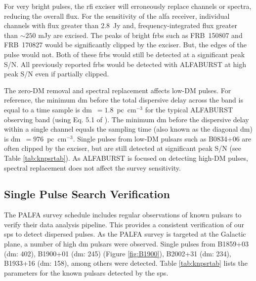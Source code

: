 \documentclass[a4paper,fleqn,usenatbib]{mnras}
\begin{document}
For very bright pulses, the \gls{rfi} exciser will erroneously replace channels
or spectra, reducing the overall flux.  For the sensitivity of the \gls{alfa}
receiver, individual channels with flux greater than 2.8~Jy and,
frequency-integrated flux greater than $\sim250$ mJy are excised. The peaks of
bright \glspl{frb} such as FRB~150807 and FRB~170827 would be significantly
clipped by the exciser. But, the edges of the pulse would not. Both of these
\glspl{frb} would still be detected at a significant peak S/N. All previously
reported \glspl{frb} would be detected with ALFABURST at high peak S/N even if
partially clipped.

The zero-DM removal and spectral replacement affects low-DM pulses. For
reference, the minimum \gls{dm} before the total dispersive delay across the
band is equal to a time sample is \gls{dm}~$=1.8$~pc~cm$^{-3}$ for the
typical ALFABURST observing band (using Eq. 5.1 of \cite{2004hpa..book.....L}).
The minimum \gls{dm} before the dispersive delay within a single channel equals
the sampling time (also known as the diagonal \gls{dm}) is 
\gls{dm}~$=976$~pc~cm$^{-3}$. Single pulses from low-DM pulsars such
as B0834+06 are often clipped by the exciser, but are still detected at
significant peak S/N (see Table \ref{tab:knpsrtab}). As ALFABURST is focused on
detecting high-DM pulses, spectral replacement does not affect the survey
sensitivity.



\subsection{Single Pulse Search Verification}
\label{sec:system_verify}

The PALFA survey schedule includes regular observations of known pulsars to
verify their data analysis pipeline. This provides a consistent verification of
our \gls{sps} to detect dispersed pulses. As the PALFA survey is targeted at the
Galactic plane, a number of high \gls{dm} pulsars were observed. Single pulses
from B1859+03 (\gls{dm}: 402), B1900+01 (\gls{dm}: 245) (Figure
\ref{fig:B1900}), B2002+31 (\gls{dm}: 234), B1933+16 (\gls{dm}: 158), among
others were detected. Table \ref{tab:knpsrtab} lists the parameters for the
known pulsars detected by the \gls{sps}.
\end{document}
